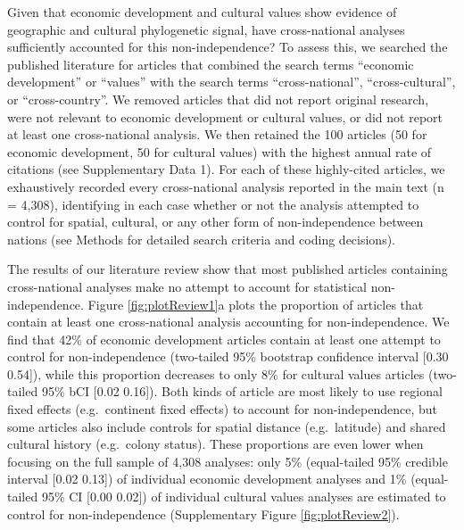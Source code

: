 \documentclass[
  man,floatsintext]{apa6}
\begin{document}
Given that economic development and cultural values show evidence of geographic and cultural phylogenetic signal, have cross-national analyses sufficiently accounted for this non-independence? To assess this, we searched the published literature for articles that combined the search terms ``economic development'' or ``values'' with the search terms ``cross-national'', ``cross-cultural'', or ``cross-country''. We removed articles that did not report original research, were not relevant to economic development or cultural values, or did not report at least one cross-national analysis. We then retained the 100 articles (50 for economic development, 50 for cultural values) with the highest annual rate of citations (see Supplementary Data 1). For each of these highly-cited articles, we exhaustively recorded every cross-national analysis reported in the main text (n = 4,308), identifying in each case whether or not the analysis attempted to control for spatial, cultural, or any other form of non-independence between nations (see Methods for detailed search criteria and coding decisions).

The results of our literature review show that most published articles containing cross-national analyses make no attempt to account for statistical non-independence. Figure \ref{fig:plotReview1}a plots the proportion of articles that contain at least one cross-national analysis accounting for non-independence. We find that 42\% of economic development articles contain at least one attempt to control for non-independence (two-tailed 95\% bootstrap confidence interval {[}0.30 0.54{]}), while this proportion decreases to only 8\% for cultural values articles (two-tailed 95\% bCI {[}0.02 0.16{]}). Both kinds of article are most likely to use regional fixed effects (e.g.~continent fixed effects) to account for non-independence, but some articles also include controls for spatial distance (e.g.~latitude) and shared cultural history (e.g.~colony status). These proportions are even lower when focusing on the full sample of 4,308 analyses: only 5\% (equal-tailed 95\% credible interval {[}0.02 0.13{]}) of individual economic development analyses and 1\% (equal-tailed 95\% CI {[}0.00 0.02{]}) of individual cultural values analyses are estimated to control for non-independence (Supplementary Figure \ref{fig:plotReview2}).
\end{document}
